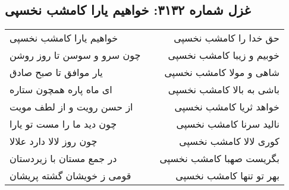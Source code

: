 \begin{center}
\section*{غزل شماره ۳۱۳۲: خواهیم یارا کامشب نخسپی}
\label{sec:3132}
\begin{longtable}{l p{0.5cm} r}
خواهیم یارا کامشب نخسپی
&&
حق خدا را کامشب نخسپی
\\
چون سرو و سوسن تا روز روشن
&&
خوبیم و زیبا کامشب نخسپی
\\
یار موافق تا صبح صادق
&&
شاهی و مولا کامشب نخسپی
\\
ای ماه پاره همچون ستاره
&&
باشی به بالا کامشب نخسپی
\\
از حسن رویت و از لطف مویت
&&
خواهد ثریا کامشب نخسپی
\\
چون دید ما را مست تو یارا
&&
نالید سرنا کامشب نخسپی
\\
چون روز لالا دارد علالا
&&
کوری لالا کامشب نخسپی
\\
در جمع مستان با زیردستان
&&
بگریست صهبا کامشب نخسپی
\\
قومی ز خویشان گشته پریشان
&&
بهر تو تنها کامشب نخسپی
\\
\end{longtable}
\end{center}
